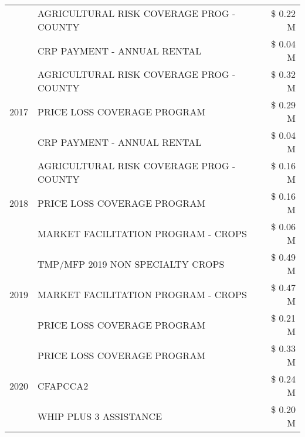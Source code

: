 \begin{tabular}{llr}
 & AGRICULTURAL RISK COVERAGE PROG - COUNTY & \$ 0.22 M \\
 & CRP PAYMENT - ANNUAL RENTAL & \$ 0.04 M \\
\cline{1-3}
\multirow[t]{3}{*}{2017} & AGRICULTURAL RISK COVERAGE PROG - COUNTY & \$ 0.32 M \\
 & PRICE LOSS COVERAGE PROGRAM & \$ 0.29 M \\
 & CRP PAYMENT - ANNUAL RENTAL & \$ 0.04 M \\
\cline{1-3}
\multirow[t]{3}{*}{2018} & AGRICULTURAL RISK COVERAGE PROG - COUNTY & \$ 0.16 M \\
 & PRICE LOSS COVERAGE PROGRAM & \$ 0.16 M \\
 & MARKET FACILITATION PROGRAM - CROPS & \$ 0.06 M \\
\cline{1-3}
\multirow[t]{3}{*}{2019} & TMP/MFP 2019 NON SPECIALTY CROPS & \$ 0.49 M \\
 & MARKET FACILITATION PROGRAM - CROPS & \$ 0.47 M \\
 & PRICE LOSS COVERAGE PROGRAM & \$ 0.21 M \\
\cline{1-3}
\multirow[t]{3}{*}{2020} & PRICE LOSS COVERAGE PROGRAM & \$ 0.33 M \\
 & CFAPCCA2 & \$ 0.24 M \\
 & WHIP PLUS 3 ASSISTANCE & \$ 0.20 M \\
\cline{1-3}
\bottomrule
\end{tabular}
